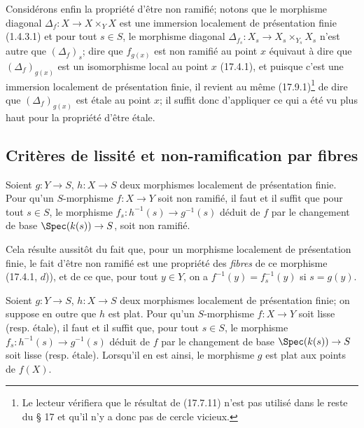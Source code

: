 Considérons enfin la propriété d'être non ramifié; notons que le morphisme diagonal $\Delta_f:X\to X\times_Y X$ est une immersion localement de présentation finie (1.4.3.1) et pour tout $s\in S$, le morphisme diagonal $\Delta_{f_s}:X_s\to X_s\times_{Y_s}X_s$ n'est autre que $(\Delta_f)_s$; dire que $f_{g(x)}$ est non ramifié au point $x$ équivaut à dire que $(\Delta_f)_{g(x)}$ est un isomorphisme local au point $x$ (17.4.1), et puisque c'est une immersion localement de présentation finie, il revient au même (17.9.1)\footnote{Le lecteur vérifiera que le résultat de (17.7.11) n'est pas utilisé dans le reste du § 17 et qu'il n'y a donc pas de cercle vicieux.} de dire que $(\Delta_f)_{g(x)}$ est étale au point $x$; il suffit donc d'appliquer ce qui a été vu plus haut pour la propriété d'être étale.


\subsection{Critères de lissité et non-ramification par fibres}
\label{subsection:IV.17.8}
\label{IV.17.8}

\begin{proposition}[17.8.1]
\label{IV.17.8.1}
Soient $g:Y\to S$, $h:X\to S$ deux morphismes localement de présentation finie. Pour qu'un $S$-morphisme $f:X\to Y$ soit non ramifié, il faut et il suffit que pour tout $s\in S$, le morphisme $f_s:h^{-1}(s)\to g^{-1}(s)$ déduit de $f$ par le changement de base $\Spec(k(s))\to S$, soit non ramifié.
\end{proposition}

Cela résulte aussitôt du fait que, pour un morphisme localement de présentation finie, le fait d'être non ramifié est une propriété des \emph{fibres} de ce morphisme (17.4.1, $d$)), et de ce que, pour tout $y\in Y$, on a $f^{-1}(y)=f_s^{-1}(y)$ si $s=g(y)$.

\begin{proposition}[17.8.2]
\label{IV.17.8.2}
Soient $g:Y\to S$, $h:X\to S$ deux morphismes localement de présentation finie; on suppose en outre que $h$ est plat. Pour qu'un $S$-morphisme $f:X\to Y$ soit lisse (resp. étale), il faut et il suffit que, pour tout $s\in S$, le morphisme $f_s:h^{-1}(s)\to g^{-1}(s)$ déduit de $f$ par le changement de base $\Spec(k(s))\to S$ soit lisse (resp. étale). Lorsqu'il en est ainsi, le morphisme $g$ est plat aux points de $f(X)$.
\end{proposition}

